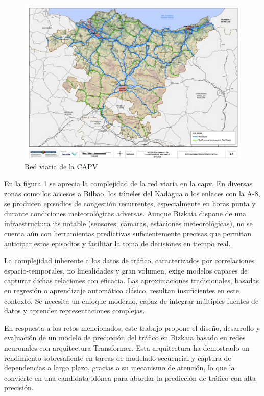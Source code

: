 \begin{figure}[h]
	\centering
	\includegraphics[scale=0.5]{includes/red_viaria_capv.png}
	\caption[Red viaria de la CAPV, extraído del Tercer Plan General de Carreteras del País Vasco 2017-2028. Fuente: https://www.euskadi.eus/tercer-plan-general-de-carreteras-del-pais-vasco-2017-2028/web01-a2bideko/es/]{Red viaria de la CAPV}
	\label{fig:red_viaria}
\end{figure}


En la figura \ref{fig:red_viaria} se aprecia la complejidad de la red viaria en la \acrshort{capv}. En diversas zonas como los accesos a Bilbao, los túneles del Kadagua o los enlaces con la A-8, se producen episodios de congestión recurrentes, especialmente en horas punta y durante condiciones meteorológicas adversas. Aunque Bizkaia dispone de una infraestructura \acrshort{its} notable (sensores, cámaras, estaciones meteorológicas), no se cuenta aún con herramientas predictivas suficientemente precisas que permitan anticipar estos episodios y facilitar la toma de decisiones en tiempo real.

La complejidad inherente a los datos de tráfico, caracterizados por correlaciones espacio-temporales, no linealidades y gran volumen, exige modelos capaces de capturar dichas relaciones con eficacia. Las aproximaciones tradicionales, basadas en regresión o aprendizaje automático clásico, resultan insuficientes en este contexto. Se necesita un enfoque moderno, capaz de integrar múltiples fuentes de datos y aprender representaciones complejas.

En respuesta a los retos mencionados, este trabajo propone el diseño, desarrollo y evaluación de un modelo de predicción del tráfico en Bizkaia basado en redes neuronales con arquitectura Transformer. Esta arquitectura ha demostrado un rendimiento sobresaliente en tareas de modelado secuencial y captura de dependencias a largo plazo, gracias a su mecanismo de atención, lo que la convierte en una candidata idónea para abordar la predicción de tráfico con alta precisión.

